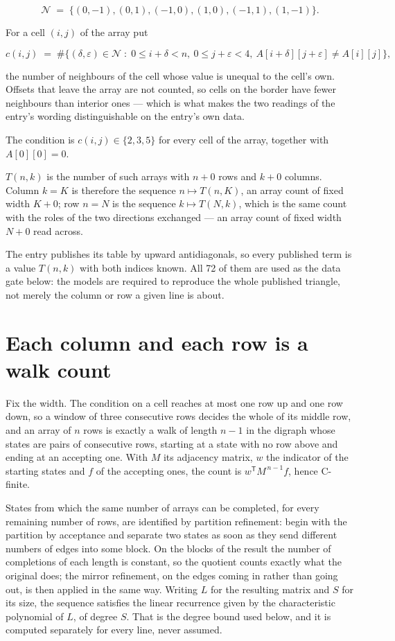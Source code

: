 \documentclass[11pt]{article}
\theoremstyle{definition}
\begin{document}
\[\mathcal{N} \;=\; \{(0,-1), (0,1), (-1,0), (1,0), (-1,1), (1,-1)\}.\]

For a cell $(i,j)$ of the array put

\[c(i,j) \;=\; \#\bigl\{(\delta,\varepsilon)\in\mathcal{N} \;:\; 0\le i+\delta<n,\ 0\le j+\varepsilon<4,\ A[i+\delta][j+\varepsilon] \neq A[i][j]\bigr\},\]

the number of neighbours of the cell whose value is unequal to the cell's own. Offsets that leave the array are not counted, so cells on the border have fewer neighbours than interior ones --- which is what makes the two readings of the entry's wording distinguishable on the entry's own data.

The condition is $c(i,j) \in \{2, 3, 5\}$ for every cell of the array, together with $A[0][0]=0$.

$T(n,k)$ is the number of such arrays with $n + 0$ rows and $k + 0$ columns. Column $k = K$ is therefore the sequence $n \mapsto T(n,K)$, an array count of fixed width $K + 0$; row $n = N$ is the sequence $k \mapsto T(N,k)$, which is the same count with the roles of the two directions exchanged --- an array count of fixed width $N + 0$ read across.

The entry publishes its table by upward antidiagonals, so every published term is a value $T(n,k)$ with both indices known. All 72 of them are used as the data gate below: the models are required to reproduce the whole published triangle, not merely the column or row a given line is about.

\section{Each column and each row is a walk count}

Fix the width. The condition on a cell reaches at most one row up and one row down, so a window of three consecutive rows decides the whole of its middle row, and an array of $n$ rows is exactly a walk of length $n-1$ in the digraph whose states are pairs of consecutive rows, starting at a state with no row above and ending at an accepting one. With $M$ its adjacency matrix, $w$ the indicator of the starting states and $f$ of the accepting ones, the count is $w^{\mathsf T}M^{\,n-1}f$, hence C-finite.

States from which the same number of arrays can be completed, for every remaining number of rows, are identified by partition refinement: begin with the partition by acceptance and separate two states as soon as they send different numbers of edges into some block. On the blocks of the result the number of completions of each length is constant, so the quotient counts exactly what the original does; the mirror refinement, on the edges coming in rather than going out, is then applied in the same way. Writing $L$ for the resulting matrix and $S$ for its size, the sequence satisfies the linear recurrence given by the characteristic polynomial of $L$, of degree $S$. That is the degree bound used below, and it is computed separately for every line, never assumed.
\end{document}
